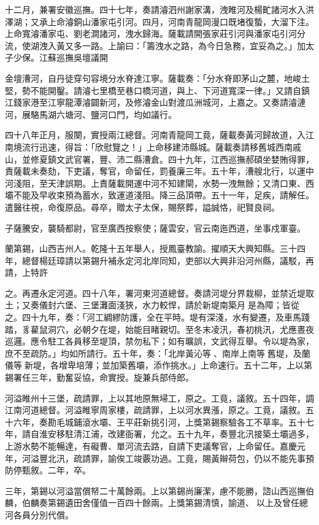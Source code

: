 \begin{pinyinscope}
十二月，兼署安徽巡撫。四十七年，奏請濬泗州謝家溝，洩睢河及楊甿諸河水入洪澤湖；又承上命濬銅山潘家屯引河。四月，河南青龍岡漫口既堵復蟄，大溜下注。上命寬濬潘家屯、劉老澗諸河，洩水歸海。薩載請開張家莊引河與潘家屯引河分流，使湖洩入黃又多一路。上諭曰：「籌洩水之路，為今日急務，宜妥為之。」加太子少保。江蘇巡撫吳壇議開

金壇漕河，自丹徒穿句容境分水脊達江寧。薩載奏：「分水脊即茅山之麓，地峻土堅，勢不能開鑿。請濬七里橋至巷口橋河道，與上、下河道寬深一律。」又請自鎮江錢家港至江寧龍潭濬闢新河，及修濬金山對渡瓜洲城河，上嘉之。又奏請濬漣河，展駱馬湖六塘河、鹽河口門，均如議行。

四十八年正月，服闋，實授兩江總督。河南青龍岡工竟，薩載奏黃河歸故道，入江南境流行迅速，得旨：「欣慰覽之！」上命移建沛縣城。薩載奏請移舊城西南戚山，並修夏鎮文武官署，豐、沛二縣漕倉。四十九年，江西巡撫郝碩坐婪賄得罪，責薩載未奏劾，下吏議，奪官，命留任，罰養廉三年。五十年，漕艘北行，以運中河淺阻，至天津誤期。上責薩載開運中河不知建閘，水勢一洩無餘；又清口東、西壩不能及早收束預為蓄水，致運道淺阻。降三品頂帶。五十一年，足疾，請解任。遣醫往視，命復原品。尋卒，贈太子太保，賜祭葬，謚誠恪，祀賢良祠。

子薩騰安，襲騎都尉，官至廣西按察使；薩雲安，官云南迤西道，坐事戍軍臺。

蘭第錫，山西吉州人。乾隆十五年舉人，授鳳臺教諭。擢順天大興知縣。三十四年，總督楊廷璋請以第錫升補永定河北岸同知，吏部以大興非沿河州縣，議駁，再請，上特許

之。再遷永定河道。四十八年，署河東河道總督。奏請河堤分界栽柳，並禁近堤取土；又奏儀封六堡、三堡灘面淺狹，水力較悍，請於新堤南築月是為障；皆從之。四十九年，奏：「河工綢繆防護，全在平時。堤有深淺，水有變遷，及車馬踐踏，豸雚鼠洞穴，必朝夕在堤，始能目睹親切。至冬末凌汛，春初桃汛，尤應晝夜巡邏。應令駐工各員移至堤頂，禁勿私下；如有曠誤，文武得互舉。令以堤為家，庶不至疏防。」均如所請行。五十年，奏：「北岸黃沁等、南岸上南等舊堤，及蘭儀等新堤，各增卑培薄；並加築舊壩，添作挑水。」上命速行。五十二年，上以第錫署任三年，勤奮妥協，命實授。旋兼兵部侍郎。

河溢睢州十三堡，疏請罪，上以其地原無埽工，原之。工竟，議敘。五十四年，調江南河道總督。河溢睢寧周家樓，疏請罪，上以河水異漲，原之。工竟，議敘。五十六年，奏勘毛城鋪滾水壩、王平莊新挑引河，上獎第錫察驗各工不草率。五十七年，請自淮安移駐清江浦，改建衙署，允之。五十九年，奏豐北汛接築土壩過多，上游水勢不能暢達，有礙曹、單河流去路，自請下吏議奪官，上命留任。嘉慶元年，河溢豐北汛，疏請罪，諭俟工竣覈功過。工竟，賜黃辮荷包，仍以不能先事預防停甄敘。二年，卒。

三年，第錫以河溢當償帑二十萬餘兩。上以第錫尚廉潔，慮不能勝，諮山西巡撫伯麟，伯麟奏第錫遺田舍僅值一百四十餘兩。上獎第錫清慎，諭道、以上及曾任總河各員分別代償。


\end{pinyinscope}

